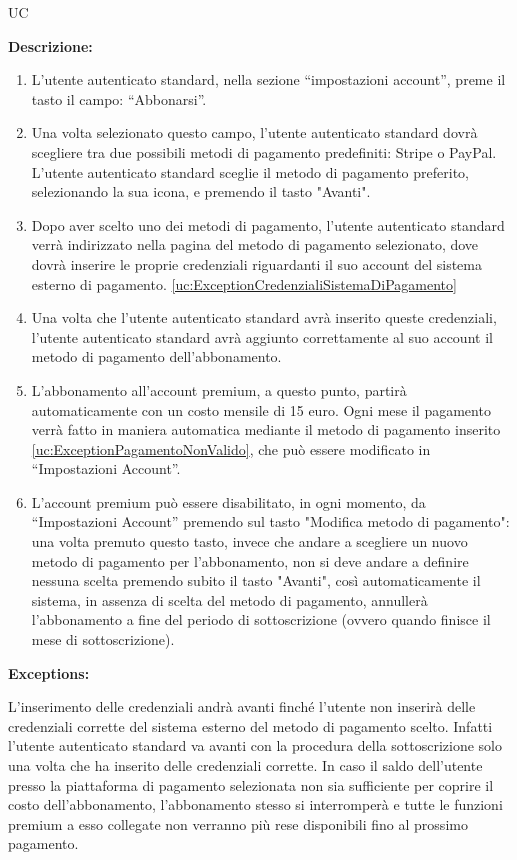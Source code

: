 \begin{listaPersonale}{UC}
\begin{listaPersonale2}[UC] {}
        \textbf{Descrizione:}
        \begin{enumerate}
            \item L'utente autenticato standard, nella sezione “impostazioni account”, preme il tasto il campo: “Abbonarsi”.
            \item Una volta selezionato questo campo, l'utente autenticato standard dovrà scegliere tra due possibili metodi di pagamento predefiniti: Stripe o PayPal. L'utente autenticato standard sceglie il metodo di pagamento preferito, selezionando la sua icona, e premendo il tasto "Avanti".
            \item Dopo aver scelto uno dei metodi di pagamento, l'utente autenticato standard verrà indirizzato nella pagina del metodo di pagamento selezionato, dove dovrà inserire le proprie credenziali riguardanti il suo account del sistema esterno di pagamento. \ref{uc:ExceptionCredenzialiSistemaDiPagamento}
            \item Una volta che l'utente autenticato standard avrà inserito queste credenziali, l'utente autenticato standard avrà aggiunto correttamente al suo account il metodo di pagamento dell'abbonamento.
            \item L'abbonamento all'account premium, a questo punto, partirà automaticamente con un costo mensile di 15 euro. Ogni mese il pagamento verrà fatto in maniera automatica mediante il metodo di pagamento inserito \ref{uc:ExceptionPagamentoNonValido}, che può essere modificato in “Impostazioni Account”.
            \item L'account premium può essere disabilitato, in ogni momento, da “Impostazioni Account” premendo sul tasto "Modifica metodo di pagamento": una volta premuto questo tasto, invece che andare a scegliere un nuovo metodo di pagamento per l'abbonamento, non si deve andare a definire nessuna scelta premendo subito il tasto "Avanti", così automaticamente il sistema, in assenza di scelta del metodo di pagamento, annullerà l'abbonamento a fine del periodo di sottoscrizione (ovvero quando finisce il mese di sottoscrizione).
        \end{enumerate}

        \textbf{Exceptions:}
        \begin{enumerate}[label=\textbf{[exception \arabic{enumiii}]}, ref= \textbf{[exception \arabic{enumiii}]}]
             L'inserimento delle credenziali andrà avanti finché l'utente non inserirà delle credenziali corrette del sistema esterno del metodo di pagamento scelto. Infatti l'utente autenticato standard va avanti con la procedura della sottoscrizione solo una volta che ha inserito delle credenziali corrette.
             In caso il saldo dell'utente presso la piattaforma di pagamento selezionata non sia sufficiente per coprire il costo dell'abbonamento, l'abbonamento stesso si interromperà e tutte le funzioni premium a esso collegate non verranno più rese disponibili fino al prossimo pagamento.
        \end{enumerate}



\end{listaPersonale2}
\end{listaPersonale}
